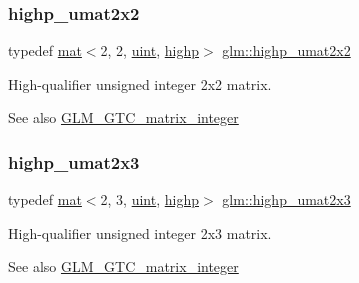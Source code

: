 \subsubsection{\texorpdfstring{highp\+\_\+umat2x2}{highp\_umat2x2}}
{\footnotesize\ttfamily typedef \mbox{\hyperlink{structglm_1_1mat}{mat}}$<$2, 2, \mbox{\hyperlink{group__core__precision_ga4fd29415871152bfb5abd588334147c8}{uint}}, \mbox{\hyperlink{namespaceglm_a36ed105b07c7746804d7fdc7cc90ff25ac6f7eab42eacbb10d59a58e95e362074}{highp}}$>$ \mbox{\hyperlink{group__gtc__matrix__integer_ga21045c3ef9df4966779713fa1a7b4b52}{glm\+::highp\+\_\+umat2x2}}}

High-\/qualifier unsigned integer 2x2 matrix. \begin{DoxySeeAlso}{See also}
\mbox{\hyperlink{group__gtc__matrix__integer}{G\+L\+M\+\_\+\+G\+T\+C\+\_\+matrix\+\_\+integer}} 
\end{DoxySeeAlso}
\mbox{\label{group__gtc__matrix__integer_ga0264db97a9144fa08315b5a4f455872f}} 
\subsubsection{\texorpdfstring{highp\+\_\+umat2x3}{highp\_umat2x3}}
{\footnotesize\ttfamily typedef \mbox{\hyperlink{structglm_1_1mat}{mat}}$<$2, 3, \mbox{\hyperlink{group__core__precision_ga4fd29415871152bfb5abd588334147c8}{uint}}, \mbox{\hyperlink{namespaceglm_a36ed105b07c7746804d7fdc7cc90ff25ac6f7eab42eacbb10d59a58e95e362074}{highp}}$>$ \mbox{\hyperlink{group__gtc__matrix__integer_ga0264db97a9144fa08315b5a4f455872f}{glm\+::highp\+\_\+umat2x3}}}

High-\/qualifier unsigned integer 2x3 matrix. \begin{DoxySeeAlso}{See also}
\mbox{\hyperlink{group__gtc__matrix__integer}{G\+L\+M\+\_\+\+G\+T\+C\+\_\+matrix\+\_\+integer}} 
\end{DoxySeeAlso}
\mbox{\label{group__gtc__matrix__integer_ga451e726ea1f020c97b2f8aa41242055b}} 
